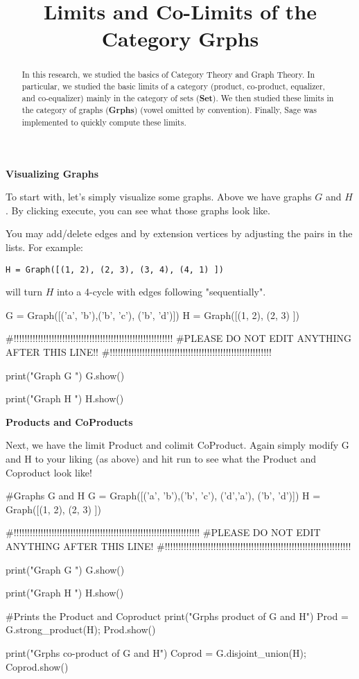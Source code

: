 \documentclass{ximera}
\title{Limits and Co-Limits of the Category Grphs}
\begin{document}
      
\begin{abstract}
      
In this research, we studied the basics of Category Theory and Graph Theory. In particular, we studied the basic limits of a category (product, co-product, equalizer, and co-equalizer) mainly in the category of sets (\textbf{Set}). We then studied these limits in the category of graphs (\textbf{Grphs}) (vowel omitted by convention). Finally, Sage was implemented to quickly compute these limits.      
\end{abstract}
      
\maketitle

\textbf{Visualizing Graphs}      

 To start with, let's simply visualize some graphs.  Above we have graphs $G$ and $H$.  By clicking execute, you can see what those graphs look like.

 You may add/delete edges and by extension vertices by adjusting the pairs in the lists.  For example:

\begin{verbatim}
H = Graph([(1, 2), (2, 3), (3, 4), (4, 1) ])
\end{verbatim}

will turn $H$ into a 4-cycle with edges following "sequentially".     

\begin{sageCell}
G = Graph([('a', 'b'),('b', 'c'), ('b', 'd')])
H = Graph([(1, 2), (2, 3) ])

#!!!!!!!!!!!!!!!!!!!!!!!!!!!!!!!!!!!!!!!!!!!!!!!!!!!!!!!!!!!
#PLEASE DO NOT EDIT ANYTHING AFTER THIS LINE!!
#!!!!!!!!!!!!!!!!!!!!!!!!!!!!!!!!!!!!!!!!!!!!!!!!!!!!!!!!!!!!

print("\n\n Graph G \n")
G.show()

print("\n\n Graph H \n\n")
H.show()
\end{sageCell}


\textbf{Products and CoProducts}

Next, we have the limit Product and colimit CoProduct.  Again simply modify G and H to your liking (as above) and hit run to see what the Product and Coproduct look like!


\begin{sageCell}
#Graphs G and H
G = Graph([('a', 'b'),('b', 'c'), ('d','a'), ('b', 'd')])
H = Graph([(1, 2), (2, 3) ])

#!!!!!!!!!!!!!!!!!!!!!!!!!!!!!!!!!!!!!!!!!!!!!!!!!!!!!!!!!!!!!!!!!!!!!
#PLEASE DO NOT EDIT ANYTHING AFTER THIS LINE!
#!!!!!!!!!!!!!!!!!!!!!!!!!!!!!!!!!!!!!!!!!!!!!!!!!!!!!!!!!!!!!!!!!!!!!

print("\n\n Graph G \n")
G.show()


print("\n\n Graph H \n\n")
H.show()

#Prints the Product and Coproduct
print("Grphs product of G and H")
Prod = G.strong_product(H); Prod.show()

print("Grphs co-product of G and H")
Coprod = G.disjoint_union(H); Coprod.show()

\end{sageCell}
\end{document}

